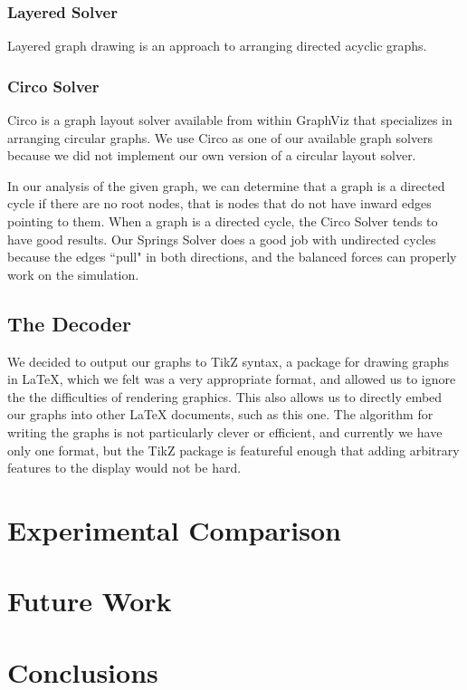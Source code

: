 \documentclass{article}
\begin{document}
\subsubsection{Layered Solver}
Layered graph drawing is an approach to arranging directed acyclic graphs.


\subsubsection{Circo Solver}
Circo is a graph layout solver available from within GraphViz that specializes in arranging circular graphs. 
We use Circo as one of our available graph solvers because we did not implement our own version of a circular layout solver.


In our analysis of the given graph, we can determine that a graph is a directed cycle if there are no root nodes, that is nodes that do not have inward edges pointing to them. When a graph is a directed cycle, the Circo Solver tends to have good results. Our Springs Solver does a good job with undirected cycles because the edges ``pull" in both directions, and the balanced forces can properly work on the simulation. 




\subsection{The Decoder}
We decided to output our graphs to TikZ syntax, a package for drawing graphs in LaTeX, which we felt was a very appropriate format, and allowed us to ignore the 
the difficulties of rendering graphics. This also allows us to directly embed our graphs into other LaTeX documents, such as this one. The algorithm for 
writing the graphs is not particularly clever or efficient, and currently we have only one format, but the TikZ package is featureful enough that adding arbitrary
features to the display would not be hard.


\section{Experimental Comparison}


\section{Future Work}


\section{Conclusions}



\end{document}
